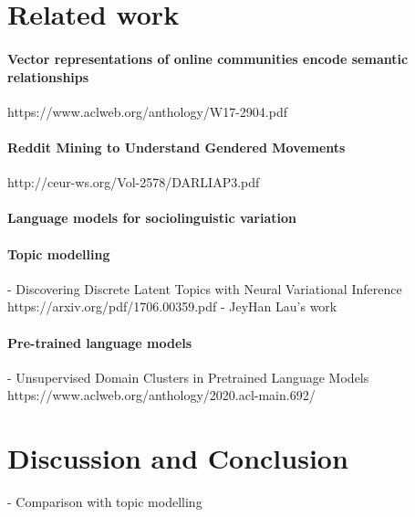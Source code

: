 \documentclass[11pt,a4paper]{article}
\begin{document}
\section{Related work}

\paragraph{Vector representations of online communities encode semantic relationships}
https://www.aclweb.org/anthology/W17-2904.pdf

\paragraph{Reddit Mining to Understand Gendered Movements}
http://ceur-ws.org/Vol-2578/DARLIAP3.pdf

\paragraph{Language models for sociolinguistic variation}
\cite{DelTredici2017}

\paragraph{Topic modelling}
- Discovering Discrete Latent Topics with Neural Variational Inference https://arxiv.org/pdf/1706.00359.pdf
- JeyHan Lau's work

\paragraph{Pre-trained language models}
- Unsupervised Domain Clusters in Pretrained Language Models https://www.aclweb.org/anthology/2020.acl-main.692/


\section{Discussion and Conclusion}

- Comparison with topic modelling



\end{document}
